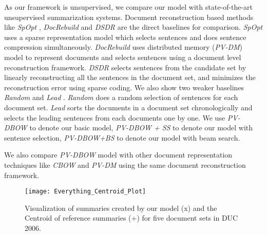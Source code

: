 \documentclass[11pt,a4paper]{article}
\begin{document}
As our framework is unsupervised, we compare our model with state-of-the-art unsupervised summarization systems. Document reconstruction based methods like \textit{SpOpt} \cite{spopt}, \textit{DocRebuild} \cite{docrebuild} and \textit{DSDR} \cite{dsdr} are the direct baselines for comparison. \textit{SpOpt} uses a sparse representation model which selects sentences and does sentence compression simultaneously. \textit{DocRebuild} uses distributed memory (\textit{PV-DM}) model to represent documents and selects sentences using a document level reconstruction framework. \textit{DSDR} selects sentences from the candidate set by linearly reconstructing all the sentences in the document set, and minimizes the reconstruction error using sparse coding. We also show two weaker baselines \textit{Random} and \textit{Lead} \cite{lead}. \textit{Random} does a random selection of sentences for each document set. \textit{Lead} sorts the documents in a document set chronologically and  selects the leading sentences from each documents one by one. We use \textit{PV-DBOW} to denote our basic model, \textit{PV-DBOW + SS} to denote our model with sentence selection, \textit{PV-DBOW+BS} to denote our model with beam search.

We also compare \textit{PV-DBOW} model with other document representation techniques like \textit{CBOW} and \textit{PV-DM} using the same document reconstruction framework.


\begin{figure}
\texttt{[image: Everything\_Centroid\_Plot]}
\caption{Visualization of summaries created by our model (x) and the Centroid of reference summaries (+) for five document sets in DUC 2006.}
\end{figure}
  
\end{document}
